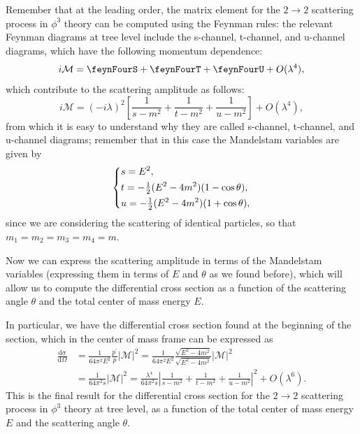 \begin{example}
    Remember that at the leading order, the matrix element for the \(2 \to 2\) scattering process in \(\phi^3\) theory can be computed using the Feynman rules: the relevant Feynman diagrams at tree level include the s-channel, t-channel, and u-channel diagrams, which have the following momentum dependence:
    \[
        i \mathcal{M} = \feynFourS + \feynFourT + \feynFourU + O(\lambda^4),
    \]
    which contribute to the scattering amplitude as follows:
    \[
        i \mathcal{M} = (-i \lambda)^2 \left[ \frac{1}{s - m^2} + \frac{1}{t - m^2} + \frac{1}{u - m^2} \right] + O(\lambda^4),
    \]
    from which it is easy to understand why they are called s-channel, t-channel, and u-channel diagrams; remember that in this case the Mandelstam variables are given by
    \[
        \begin{dcases}
            s = E^2,                                         \\
            t = -\tfrac{1}{2}(E^2 - 4 m^2)(1 - \cos \theta), \\
            u = -\tfrac{1}{2}(E^2 - 4 m^2)(1 + \cos \theta),
        \end{dcases}
    \]
    since we are considering the scattering of identical particles, so that \(m_1 = m_2 = m_3 = m_4 = m\).

    Now we can express the scattering amplitude in terms of the Mandelstam variables (expressing them in terms of \(E\) and \(\theta\) as we found before), which will allow us to compute the differential cross section as a function of the scattering angle \(\theta\) and the total center of mass energy \(E\).

    In particular, we have the differential cross section found at the beginning of the section, which in the center of mass frame can be expressed as
    \[
        \begin{aligned}
            \frac{\mathrm{d\sigma}}{\mathrm{d} \Omega} & = \frac{1}{64 \pi^2 E^2} \frac{p^{\prime}}{p} |\mathcal{M}|^2 = \frac{1}{64 \pi^2 E^2} \frac{\sqrt{E^2 - 4 m^2}}{\sqrt{E^2 - 4 m^2}} |\mathcal{M}|^2             \\
                                                       & = \frac{1}{64 \pi^2 s} |\mathcal{M}|^2 = \frac{\lambda^4}{64 \pi^2 s} \left| \frac{1}{s - m^2} + \frac{1}{t - m^2} + \frac{1}{u - m^2} \right|^2 + O(\lambda^6).
        \end{aligned}
    \]
    This is the final result for the differential cross section for the \(2 \to 2\) scattering process in \(\phi^3\) theory at tree level, as a function of the total center of mass energy \(E\) and the scattering angle \(\theta\).
\end{example}

